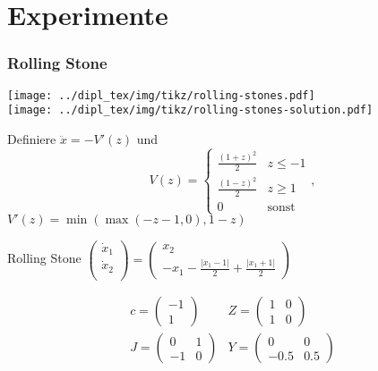 \section[Experimente]{Experimente}

\begin{frame}[<+->]
\frametitle{Rolling Stone}
\begin{minipage}[c]{0.35\textwidth}
  \texttt{[image: ../dipl\_tex/img/tikz/rolling-stones.pdf]} \\
  \texttt{[image: ../dipl\_tex/img/tikz/rolling-stones-solution.pdf]}		
\end{minipage}
\hfill
\begin{minipage}[c]{0.6\textwidth}
Definiere $\ddot x = -V'(z)$ und 
\[
 V(z) = 
 \begin{cases}
 \frac{(1+z)^2}{2} & z\leq -1\\
 \frac{(1-z)^2}{2} &  z\geq 1\\
  0 & \text{sonst}
 \end{cases},
\]
$ V'(z) = \min(\max(-z-1,0),1-z)$
\pause
\begin{block}{Rolling Stone}
\centering
  $
  \begin{pmatrix}
   \dot x_1 \\
   \dot x_2 \\
  \end{pmatrix}
 = 
 \begin{pmatrix}
  x_2 \\
  -x_1 - \frac{|x_1-1|}{2} + \frac{|x_1+1|}{2}
 \end{pmatrix}
$
\end{block}
\vspace*{-0.5cm}
\pause
\[
\begin{aligned}
c = \begin{pmatrix}
     -1\\
     1
    \end{pmatrix}
& 
 Z = \begin{pmatrix}
      1 & 0 \\
      1 & 0
     \end{pmatrix} 
 \\
J = \begin{pmatrix}
      0&1\\
      -1 & 0
     \end{pmatrix}
 &
 Y = \begin{pmatrix}
      0 & 0\\
      -0.5  & 0.5
     \end{pmatrix}
\end{aligned}
\]
\end{minipage}
\end{frame}
